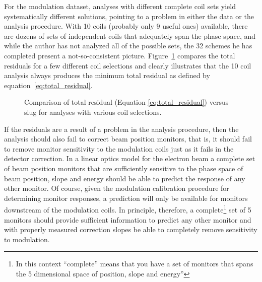 For the \Qs modulation dataset, analyses with different complete coil sets yield systematically different solutions, pointing to a problem in either the data or the analysis procedure. With 10 coils (probably only 9 useful ones) available, there are dozens of sets of independent coils that adequately span the phase space, and while the author has not analyzed all of the possible sets, the 32 schemes he has completed present a not-so-consistent picture. Figure~\ref{fig:chisquare_vs_slug} compares the total residuals for a few different coil selections and clearly illustrates that the 10 coil analysis always produces the minimum total residual as defined by equation~\ref{eq:total_residual}.
\begin{figure}[t]

\centering
{}
\caption{Comparison of total residual (Equation \ref{eq:total_residual}) versus slug for analyses with various coil selections.}
\label{fig:chisquare_vs_slug}
\end{figure}

If the residuals are a result of a problem in the analysis procedure, then the analysis should also fail to correct beam position monitors, that is, it should fail to remove monitor sensitivity to the modulation coils just as it fails in the detector correction. In a linear optics model for the electron beam a complete set of beam position monitors that are sufficiently sensitive to the phase space of beam position, slope and energy should be able to predict the response of any other monitor. Of course, given the modulation calibration procedure for determining monitor responses, a prediction will only be available for monitors downstream of the modulation coils. In principle, therefore, a complete\footnote{In this context ``complete'' means that you have a set of monitors that spans the 5 dimensional space of position, slope and energy''} set of 5 monitors should provide sufficient information to predict any other monitor and with properly measured correction slopes be able to completely remove sensitivity to modulation. 

